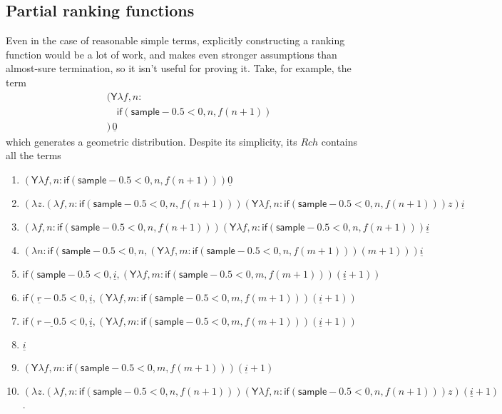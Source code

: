 \documentclass{article}
\newcommand{\tY}{\mathsf{Y}}
\newcommand{\tif}[3]{\mathsf{if}(#1, #2, #3)} %
\newcommand{\tsample}{\mathsf{sample}}
\theoremstyle{definition}
\theoremstyle{lemma}
\theoremstyle{remark}
\begin{document}
\subsection{Partial ranking functions}
Even in the case of reasonable simple terms, explicitly constructing a ranking function would be a lot of work, and  makes even stronger assumptions than almost-sure termination, so it isn't useful for proving it. Take, for example, the term
\begin{align*}
&(\tY \lambda f, n: \\
&\quad \tif{\tsample - 0.5 < 0}{n}{f (n+1)} \\
&) \, \underline{0}
\end{align*}
which generates a geometric distribution.
    Despite its simplicity, its $Rch$ contains all the terms
\begin{enumerate}
    \item $(\tY \lambda f, n: \tif{\tsample - 0.5 < 0}{n}{f (n+1)}) \underline{0}$
    \item $(\lambda z.(\lambda f, n: \tif{\tsample - 0.5 < 0}{n}{f (n+1)}) (\tY \lambda f, n: \tif{\tsample - 0.5 < 0}{n}{f (n+1)}) z) \underline{i}$
    \item $(\lambda f, n: \tif{\tsample - 0.5 < 0}{n}{f (n+1)}) (\tY \lambda f, n: \tif{\tsample - 0.5 < 0}{n}{f (n+1)}) \underline{i}$
    \item $(\lambda n: \tif{\tsample - 0.5 < 0}{n}{(\tY \lambda f, m: \tif{\tsample - 0.5 < 0}{n}{f (m+1)}) (m+1)}) \underline{i}$
    \item $\tif{\tsample - 0.5 < 0}{\underline{i}}{(\tY \lambda f, m: \tif{\tsample - 0.5 < 0}{m}{f (m+1)}) (\underline{i}+1)}$
    \item $\tif{\underline r - 0.5 < 0}{\underline{i}}{(\tY \lambda f, m: \tif{\tsample - 0.5 < 0}{m}{f (m+1)}) (\underline{i}+1)}$
    \item $\tif{\underline{r - 0.5} < 0}{\underline{i}}{(\tY \lambda f, m: \tif{\tsample - 0.5 < 0}{m}{f (m+1)}) (\underline{i}+1)}$
    \item $\underline{i}$
    \item $(\tY \lambda f, m: \tif{\tsample - 0.5 < 0}{m}{f (m+1)}) (\underline{i}+1)$
    \item $(\lambda z.(\lambda f, n: \tif{\tsample - 0.5 < 0}{n}{f (n+1)}) (\tY \lambda f, n: \tif{\tsample - 0.5 < 0}{n}{f (n+1)}) z) (\underline{i} + 1)$.
\end{enumerate}
\end{document}
